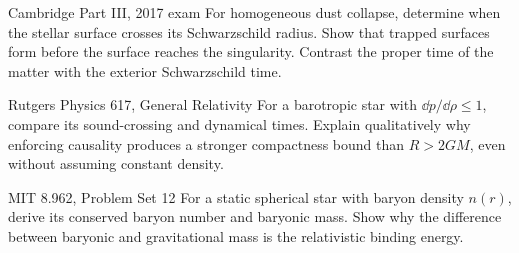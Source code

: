 \begin{exercise}{Cambridge Part III, 2017 exam}
For homogeneous dust collapse, determine when the stellar surface crosses its
Schwarzschild radius.  Show that trapped surfaces form before the surface
reaches the singularity.  Contrast the proper time of the matter with the
exterior Schwarzschild time.
\end{exercise}

\begin{exercise}{Rutgers Physics 617, General Relativity}
For a barotropic star with \(\dd p/\dd\rho\leq1\), compare its sound-crossing
and dynamical times.  Explain qualitatively why enforcing causality produces
a stronger compactness bound than \(R>2GM\), even without assuming constant
density.
\end{exercise}

\begin{exercise}{MIT 8.962, Problem Set 12}
For a static spherical star with baryon density \(n(r)\), derive its conserved
baryon number and baryonic mass.  Show why the difference between baryonic and
gravitational mass is the relativistic binding energy.
\end{exercise}
